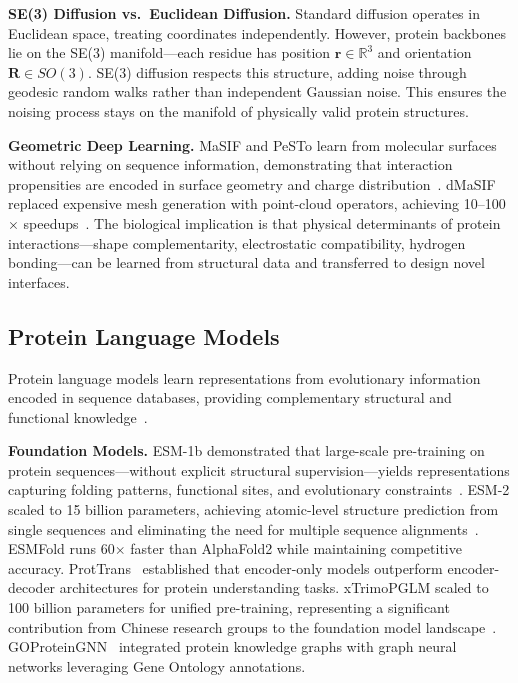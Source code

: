 \textbf{SE(3) Diffusion vs.\ Euclidean Diffusion.} Standard diffusion operates in Euclidean space, treating coordinates independently. However, protein backbones lie on the SE(3) manifold---each residue has position $\mathbf{r} \in \mathbb{R}^3$ and orientation $\mathbf{R} \in SO(3)$. SE(3) diffusion respects this structure, adding noise through geodesic random walks rather than independent Gaussian noise. This ensures the noising process stays on the manifold of physically valid protein structures.

\textbf{Geometric Deep Learning.} MaSIF and PeSTo learn from molecular surfaces without relying on sequence information, demonstrating that interaction propensities are encoded in surface geometry and charge distribution~\cite{gainza2020masif,gao2023pestoppi}. dMaSIF replaced expensive mesh generation with point-cloud operators, achieving 10--100$\times$ speedups~\cite{sverrisson2021dmasif}. The biological implication is that physical determinants of protein interactions---shape complementarity, electrostatic compatibility, hydrogen bonding---can be learned from structural data and transferred to design novel interfaces.

\subsection{Protein Language Models}

Protein language models learn representations from evolutionary information encoded in sequence databases, providing complementary structural and functional knowledge~\cite{rives2021esm1b,lin2023esm2}.

\textbf{Foundation Models.} ESM-1b demonstrated that large-scale pre-training on protein sequences---without explicit structural supervision---yields representations capturing folding patterns, functional sites, and evolutionary constraints~\cite{rives2021esm1b}. ESM-2 scaled to 15 billion parameters, achieving atomic-level structure prediction from single sequences and eliminating the need for multiple sequence alignments~\cite{lin2023esm2}. ESMFold runs 60$\times$ faster than AlphaFold2 while maintaining competitive accuracy. ProtTrans~\cite{elnaggar2021prottrans} established that encoder-only models outperform encoder-decoder architectures for protein understanding tasks. xTrimoPGLM scaled to 100 billion parameters for unified pre-training, representing a significant contribution from Chinese research groups to the foundation model landscape~\cite{chen2024xtrimopglm}. GOProteinGNN~\cite{zhao2024goproteingnn} integrated protein knowledge graphs with graph neural networks leveraging Gene Ontology annotations.

